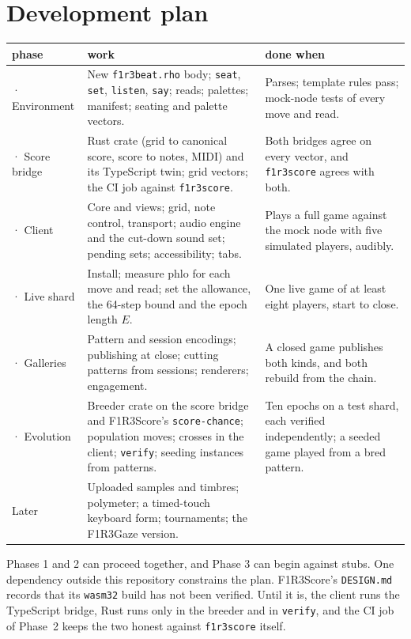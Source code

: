\documentclass[11pt,a4paper]{article}
\newcommand{\code}[1]{\texttt{#1}}
\begin{document}
\section{Development plan}\label{sec:plan}

\begin{center}\small
\begin{tabularx}{\linewidth}{@{}>{\raggedright\arraybackslash}p{28mm} X >{\raggedright\arraybackslash}p{44mm}@{}}
\toprule
phase & work & done when\\
\midrule
1 · Environment & New \code{f1r3beat.rho} body; \code{seat}, \code{set}, \code{listen}, \code{say}; reads; palettes; manifest; seating and palette vectors. & Parses; template rules pass; mock-node tests of every move and read.\\
2 · Score bridge & Rust crate (grid to canonical score, score to notes, MIDI) and its TypeScript twin; grid vectors; the CI job against \code{f1r3score}. & Both bridges agree on every vector, and \code{f1r3score} agrees with both.\\
3 · Client & Core and views; grid, note control, transport; audio engine and the cut-down sound set; pending sets; accessibility; tabs. & Plays a full game against the mock node with five simulated players, audibly.\\
4 · Live shard & Install; measure phlo for each move and read; set the allowance, the 64-step bound and the epoch length $E$. & One live game of at least eight players, start to close.\\
5 · Galleries & Pattern and session encodings; publishing at close; cutting patterns from sessions; renderers; engagement. & A closed game publishes both kinds, and both rebuild from the chain.\\
6 · Evolution & Breeder crate on the score bridge and F1R3Score's \code{score-chance}; population moves; crosses in the client; \code{verify}; seeding instances from patterns. & Ten epochs on a test shard, each verified independently; a seeded game played from a bred pattern.\\
Later & Uploaded samples and timbres; polymeter; a timed-touch keyboard form; tournaments; the F1R3Gaze version. & \\
\bottomrule
\end{tabularx}
\end{center}

Phases 1 and 2 can proceed together, and Phase 3 can begin against stubs. One dependency
outside this repository constrains the plan. F1R3Score's \code{DESIGN.md} records that its
\code{wasm32} build has not been verified. Until it is, the client runs the TypeScript bridge,
Rust runs only in the breeder and in \code{verify}, and the CI job of Phase~2 keeps the two
honest against \code{f1r3score} itself.
\end{document}

